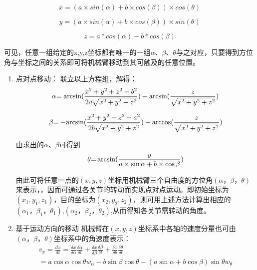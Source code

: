 \begin{equation}
x=(a \times sin(\alpha)+b \times cos(\beta)) \times cos(\theta)
\end{equation}

\begin{equation}
y=(a \times sin(\alpha)+b \times cos(\beta)) \times sin(\theta)
\end{equation}

\begin{equation}
z=a*cos(\alpha)-b*cos(\beta)
\end{equation}

可见，任意一组给定的x,y,z坐标都有唯一的一组$\alpha$、$\beta$、$\theta$与之对应，只要得到方位角与坐标之间的关系即可将机械臂移动到其可触及的任意位置。

\begin{enumerate}
\item 点对点移动：
联立以上方程组，解得：
\begin{displaymath}
\alpha {\rm{ = arcsin(}}\frac{{{x^2} + {y^2} + {z^2} - {b^2}}}{{2a\sqrt {{x^2} + {y^2} + {z^2}} }}) - {\rm{arcsin(}}\frac{z}{{\sqrt {{x^2} + {y^2} + {z^2}} }})
\end{displaymath}

\begin{displaymath}
\beta {\rm{ =  - arcsin(}}\frac{{{x^2} + {y^2} + {z^2} - {a^2}}}{{2b\sqrt {{x^2} + {y^2} + {z^2}} }}) + {\rm{arccos(}}\frac{z}{{\sqrt {{x^2} + {y^2} + {z^2}} }})
\end{displaymath}

由求出的$\alpha$、$\beta$可得到
\begin{equation}
\theta {\rm{ = }}\arcsin (\frac{y}{{a \times \sin \alpha  + b \times \cos \beta }})
\end{equation}

由此可将任意一点的$(x,y,z)$坐标用机械臂三个自由度的方位角$(\alpha，\beta，\theta)$来表示，，因而可通过各关节的转动而实现点对点运动。即初始坐标为$(x_1,y_1,z_1)$，目的坐标为$(x_2,y_2,z_2)$，则可用上述方法计算出相应的$(\alpha_1，\beta_1，\theta_1)$,$(\alpha_2，\beta_2，\theta_2)$,从而得知各关节需转动的角度。

\item 基于运动方向的移动
机械臂在$(x,y,z)$坐标系中各轴的速度分量也可由$(\alpha，\beta，\theta)$坐标系中的角速度表示：
\begin{displaymath}
\begin{array}{l}
{v_x} = \frac{{dx}}{{dt}} = \frac{{\delta x}}{{\delta \alpha }}\frac{{\delta \alpha }}{{\delta t}} + \frac{{\delta x}}{{\delta \beta }}\frac{{\delta \beta }}{{\delta t}} + \frac{{\delta x}}{{\delta \theta }}\frac{{\delta \theta }}{{\delta t}} \\= a\cos \alpha \cos \theta {w_\alpha } - b\sin \beta \cos \theta  - (a\sin \alpha  + b\cos \beta )\sin \theta {w_\theta }\\


\end{array}
\end{displaymath}
\end{enumerate}
